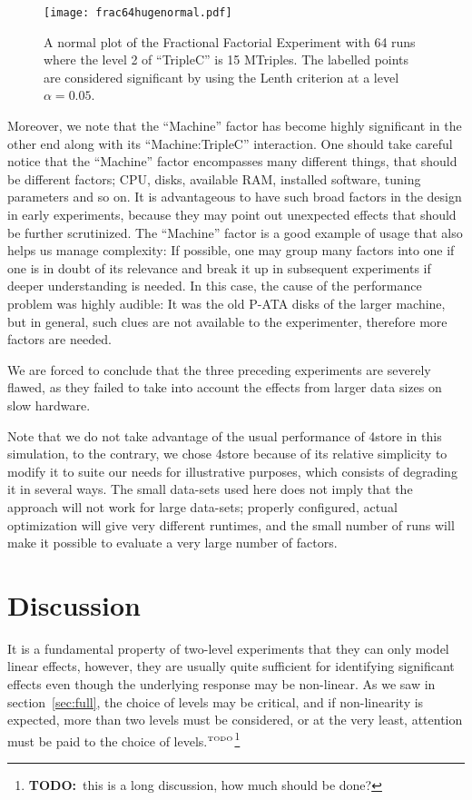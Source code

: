 \documentclass{llncs}
\newcommand{\todo}[1]{\ensuremath{^{\textrm{\tiny{TODO}\normalsize}}}\footnote{\textbf{TODO:}~#1}}
\begin{document}
\begin{figure}[h!]
  \texttt{[image: frac64hugenormal.pdf]}
  \caption{A normal plot of the Fractional Factorial Experiment with
    64 runs where the level 2 of ``TripleC'' is 15 MTriples. The
    labelled points are considered significant by using the Lenth
    criterion at a level $\alpha=0.05$.}\label{fig:frac64hugenormal}
\end{figure}


Moreover, we note that the ``Machine'' factor has become highly
significant in the other end along with its ``Machine:TripleC''
interaction. One should take careful notice that the ``Machine''
factor encompasses many different things, that should be different
factors; CPU, disks, available RAM, installed software, tuning
parameters and so on. It is advantageous to have such broad factors in
the design in early experiments, because they may point out unexpected
effects that should be further scrutinized. The ``Machine'' factor is
a good example of usage that also helps us manage complexity: If
possible, one may group many factors into one if one is in doubt of
its relevance and break it up in subsequent experiments if deeper
understanding is needed. In this case, the cause of the performance
problem was highly audible: It was the old P-ATA disks of the larger
machine, but in general, such clues are not available to the
experimenter, therefore more factors are needed.

We are forced to conclude that the three preceding experiments are
severely flawed, as they failed to take into account the effects from
larger data sizes on slow hardware.


Note that we do not take advantage of the usual performance of 4store
in this simulation, to the contrary, we chose 4store because of its
relative simplicity to modify it to suite our needs for illustrative
purposes, which consists of degrading it in several ways. The small
data-sets used here does not imply that the approach will not work for
large data-sets; properly configured, actual optimization will give
very different runtimes, and the small number of runs will make it
possible to evaluate a very large number of factors.



\section{Discussion}

It is a fundamental property of two-level experiments that they can
only model linear effects, however, they are usually quite sufficient
for identifying significant effects even though the underlying
response may be non-linear.  As we saw in section~\ref{sec:full}, the
choice of levels may be critical, and if non-linearity is expected,
more than two levels must be considered, or at the very least,
attention must be paid to the choice of levels.\todo{this is a long
  discussion, how much should be done?}
\end{document}
